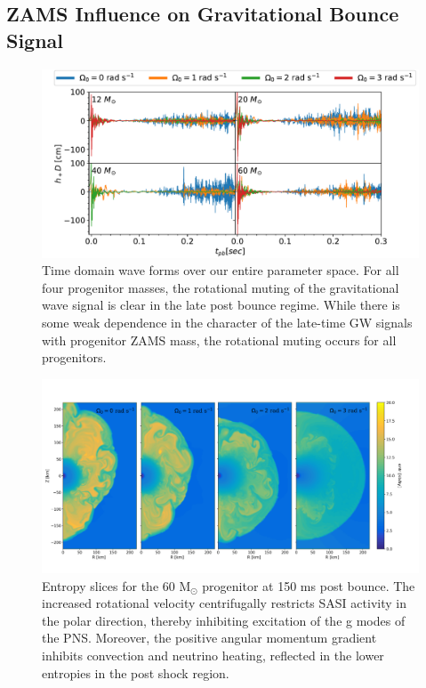 \documentclass[twocolumn,times]{aastex62}  %
\newcommand{\Msun}{\ensuremath{\mathrm{M}_\odot}\xspace}
\begin{document}



\subsection{ZAMS Influence on Gravitational Bounce Signal}

\begin{figure}[t]
\includegraphics[width=\textwidth]{figures/ccsn2D_M1_all.pdf}
\centering
\caption{Time domain wave forms over our entire parameter space.  For all four progenitor masses, the rotational muting of the gravitational wave signal is clear in the late post bounce regime.    While there is some weak dependence in the character of the late-time GW signals with progenitor ZAMS mass, the rotational muting occurs for all progenitors.}
\label{fig:ccsn_all}
\end{figure}

\begin{figure}[t!]
  \centering     %
  \includegraphics[width=\textwidth]{figures/entr_slice_2.pdf}
  \caption{Entropy slices for the 60 \Msun progenitor at 150 ms post bounce.  The increased rotational velocity centrifugally restricts SASI activity in the polar direction, thereby inhibiting excitation of the g modes of the PNS.  Moreover, the positive angular momentum gradient inhibits convection and neutrino heating, reflected in the lower entropies in the post shock region.}
  \label{fig:entr_slice}
\end{figure}
\end{document}
